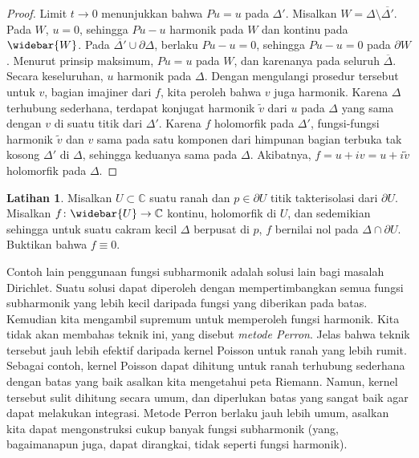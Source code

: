\documentclass[12pt,openany]{book}
\newcommand{\C}{{\mathbb{C}}}
\newcommand{\myindex}[1]{#1\index{#1}}
\theoremstyle{plain}
\theoremstyle{remark}
\theoremstyle{definition}
\newenvironment{exbox}{%
    \def\FrameCommand{\vrule width 1pt \relax\hspace{10pt}}%
    \MakeFramed{\advance\hsize-\width\FrameRestore}%
}{%
    \endMakeFramed
}
\theoremstyle{exercise}
\newtheorem{exercise}{Latihan}[section]
\theoremstyle{example}
\begin{document}
\begin{proof}
Limit
$t \to 0$ menunjukkan bahwa $Pu = u$ pada $\Delta'$.
Misalkan $W = \Delta \setminus \overline{\Delta'}$.
Pada $W$, $u=0$, sehingga $Pu-u$ harmonik pada $W$
dan kontinu pada $\widebar{W}$.
Pada $\overline{\Delta'} \cup \partial \Delta$,
berlaku $Pu-u=0$,
sehingga $Pu-u=0$ pada $\partial W$.  Menurut prinsip maksimum, $Pu=u$ pada $W$,
dan karenanya pada seluruh $\overline{\Delta}$.  Secara keseluruhan, $u$ harmonik pada
$\Delta$.
Dengan mengulangi prosedur tersebut untuk $v$, bagian imajiner dari $f$, kita peroleh
bahwa $v$ juga harmonik.
Karena $\Delta$ terhubung sederhana,
terdapat konjugat harmonik $\tilde{v}$ dari $u$ pada $\Delta$ yang sama dengan $v$ di
suatu titik dari $\Delta'$.  Karena $f$ holomorfik pada $\Delta'$,
fungsi-fungsi harmonik $\tilde{v}$ dan $v$
sama pada satu komponen dari himpunan bagian terbuka tak kosong $\Delta'$ di $\Delta$, sehingga
keduanya sama pada $\Delta$.  Akibatnya, $f = u +iv = u+i\tilde{v}$ holomorfik pada
$\Delta$.
\end{proof}

\begin{exbox}
\begin{exercise}
Misalkan $U \subset \C$ suatu ranah dan $p \in \partial U$ titik takterisolasi
dari $\partial U$.  Misalkan $f \colon \widebar{U} \to \C$ kontinu,
holomorfik di $U$, dan sedemikian sehingga untuk suatu cakram kecil $\Delta$ berpusat di
$p$, $f$ bernilai nol pada $\Delta \cap \partial U$.  Buktikan bahwa $f \equiv 0$.
\end{exercise}
\end{exbox}

Contoh lain penggunaan fungsi subharmonik adalah solusi lain
bagi masalah Dirichlet.  Suatu solusi dapat diperoleh dengan mempertimbangkan semua
fungsi subharmonik yang lebih kecil daripada fungsi yang diberikan pada batas.
Kemudian kita mengambil supremum untuk memperoleh fungsi harmonik.  Kita tidak akan
membahas teknik ini, yang disebut \emph{\myindex{metode Perron}}.
Jelas bahwa teknik tersebut jauh lebih efektif daripada kernel Poisson untuk
ranah yang lebih rumit.  Sebagai contoh, kernel Poisson dapat dihitung
untuk ranah terhubung sederhana dengan batas yang baik asalkan kita mengetahui peta Riemann.  Namun,
kernel tersebut sulit dihitung secara umum, dan diperlukan batas yang sangat baik
agar dapat melakukan integrasi.  Metode Perron berlaku jauh lebih
umum, asalkan kita dapat mengonstruksi cukup banyak fungsi subharmonik (yang,
bagaimanapun juga, dapat dirangkai, tidak seperti fungsi harmonik).
\end{document}
